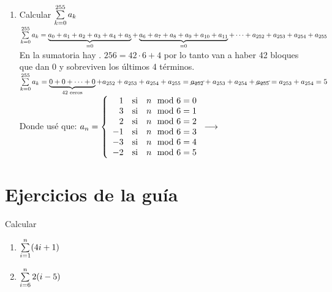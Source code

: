 \documentclass[12pt,a4paper, spanish]{article}
\begin{document}
\begin{enumerate}[label=(\alph*)]
	\item Calcular $\sumatoria{k=0}{255} a_k$ \\
	      $\sumatoria{k=0}{255} a_k =
		      \underbrace{\textstyle a_0 + a_1 + a_2 + a_3 + a_4 + a_5}_{= 0} +
		      \underbrace{\textstyle a_6 + a_7 + a_8 + a_9 + a_{10} + a_{11} }_{=0} +
		      \cdots +
		      a_{252} + a_{253} + a_{254} + a_{255}
	      $\\
	      En la sumatoria hay . $256 = 42 \cdot 6 + 4$ por lo tanto van a haber 42 bloques que dan 0 y sobreviven los últimos 4 términos.
	      $\sumatoria{k=0}{255} a_k = \underbrace{\textstyle 0 + 0 + \dots + 0}_{42 \text{ ceros}} + a_{252} + a_{253} + a_{254} + a_{255} =
		      \cancel{a_{252}} + a_{253} + a_{254} + \cancel{a_{255}} = a_{253} + a_{254} = 5\\
	      $ Donde usé que: $a_n =
		      \llave{rcl}{
			      1 & \text{si} & n\mod6 = 0 \\
			      3 & \text{si} & n\mod6 = 1 \\
			      2 & \text{si} & n\mod6 = 2 \\
			      -1 & \text{si} & n\mod6 = 3 \\
			      -3 & \text{si} & n\mod6 = 4 \\
			      -2 & \text{si} & n\mod6 = 5 \\
		      }\longrightarrow
	      $
	       \checkmark
\end{enumerate}


\section*{Ejercicios de la guía}
\ejercicio
\hacer


\ejercicio

\hacer


\ejercicio
Calcular
\begin{multicols}{2}
	\begin{enumerate}[label=\roman*)]
		\item $ \sumatoria{i=1}{n} (4i + 1) $
		      \hacer


		\item $\sumatoria{i=6}{n} 2(i-5)$
		      \hacer

	\end{enumerate}
\end{multicols}
\end{document}
